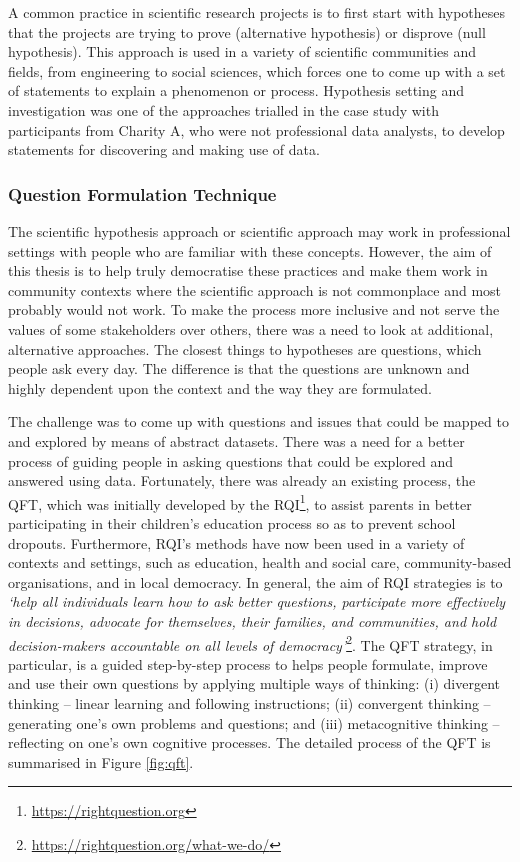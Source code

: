 A common practice in scientific research projects is to first start with hypotheses that the projects are trying to prove (alternative hypothesis) or disprove (null hypothesis). This approach is used in a variety of scientific communities and fields, from engineering to social sciences, which forces one to come up with a set of statements to explain a phenomenon or process. Hypothesis setting and investigation was one of the approaches trialled in the case study with participants from Charity A, who were not professional data analysts, to develop statements for discovering and making use of data.

\subsubsection{Question Formulation Technique}
\label{sec:qft}
The scientific hypothesis approach or scientific approach may work in professional settings with people who are familiar with these concepts. However, the aim of this thesis is to help truly democratise these practices and make them work in community contexts where the scientific approach is not commonplace and most probably would not work. To make the process more inclusive and not serve the values of some stakeholders over others, there was a need to look at additional, alternative approaches. The closest things to hypotheses are questions, which people ask every day. The difference is that the questions are unknown and highly dependent upon the context and the way they are formulated.

The challenge was to come up with questions and issues that could be mapped to and explored by means of abstract datasets. There was a need for a better process of guiding people in asking questions that could be explored and answered using data. Fortunately, there was already an existing process, the QFT, which was initially developed by the RQI\footnote{\url{https://rightquestion.org}}, to assist parents in better participating in their children's education process so as to prevent school dropouts. Furthermore, RQI's methods have now been used in a variety of contexts and settings, such as education, health and social care, community-based organisations, and in local democracy. In general, the aim of RQI strategies is to \textit{`help all individuals learn how to ask better questions, participate more effectively in decisions, advocate for themselves, their families, and communities, and hold decision-makers accountable on all levels of democracy'}\footnote{\url{https://rightquestion.org/what-we-do/}}. The QFT strategy, in particular, is a guided step-by-step process to helps people formulate, improve and use their own questions by applying multiple ways of thinking: (i) divergent thinking -- linear learning and following instructions; (ii) convergent thinking -- generating one's own problems and questions; and (iii) metacognitive thinking -- reflecting on one's own cognitive processes. The detailed process of the QFT is summarised in Figure \ref{fig:qft}.

